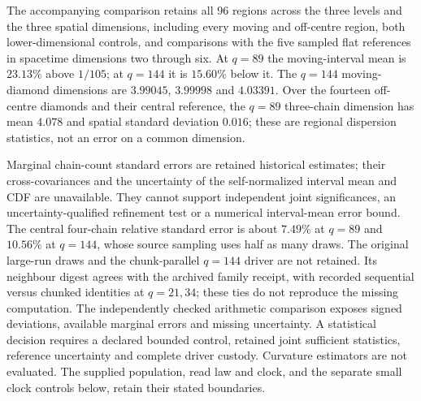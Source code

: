 The accompanying comparison retains all 96 regions across the three
levels and the three spatial dimensions, including every moving and
off-centre region, both lower-dimensional controls, and comparisons with
the five sampled flat references in spacetime dimensions two through six.
At $q=89$ the moving-interval mean is $23.13\%$ above $1/105$; at $q=144$
it is $15.60\%$ below it. The $q=144$ moving-diamond dimensions are
$3.99045$, $3.99998$ and $4.03391$. Over the fourteen off-centre diamonds
and their central reference, the $q=89$ three-chain dimension has mean
$4.078$ and spatial standard deviation $0.016$; these are regional
dispersion statistics, not an error on a common dimension.

Marginal chain-count standard errors are retained historical estimates;
their cross-covariances and the uncertainty of the self-normalized
interval mean and CDF are unavailable. They cannot support independent
joint significances, an uncertainty-qualified refinement test or a
numerical interval-mean error bound. The central four-chain relative
standard error is about $7.49\%$ at $q=89$ and $10.56\%$ at $q=144$,
whose source sampling uses half as many draws. The original large-run
draws and the chunk-parallel $q=144$ driver are not retained. Its neighbour
digest agrees with the archived family receipt, with recorded sequential
versus chunked identities at $q=21,34$; these ties do not reproduce the
missing computation. The independently checked arithmetic comparison exposes
signed deviations, available marginal errors and missing uncertainty.
A statistical decision
requires a declared bounded control, retained joint sufficient statistics,
reference uncertainty and complete driver custody. Curvature estimators
are not evaluated. The supplied population, read law and clock, and the
separate small clock controls below, retain their stated boundaries.

